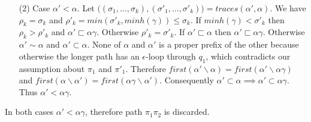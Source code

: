 \documentclass[AMA,STIX1COL]{WileyNJD-v2}
\begin{document}
\begin{proofEnd}
\begin{itemize}[itemsep=0.5em, topsep=0.5em]
    \item[(2)]
        Case $\alpha' < \alpha$.
        Let $\big( (\sigma_1, \hdots, \sigma_k), (\sigma'_1, \hdots, \sigma'_k) \big) = traces (\alpha', \alpha)$.
        We have $\rho_k = \sigma_k$ and $\rho'_k = min (\sigma'_k, minh(\gamma)) \leq \sigma_k$.
        If $minh(\gamma) < \sigma'_k$ then $\rho_k > \rho'_k$ and $\alpha' \sqsubset \alpha \gamma$.
        Otherwise $\rho'_k = \sigma'_k$.
        If $\alpha' \sqsubset \alpha$ then $\alpha' \sqsubset \alpha \gamma$.
        Otherwise $\alpha' \sim \alpha$ and $\alpha' \subset \alpha$.
        None of $\alpha$ and $\alpha'$ is a proper prefix of the other
        because otherwise the longer path has an $\epsilon$-loop through $q_1$, which contradicts our assumption about $\pi_1$ and $\pi'_1$.
        Therefore $first (\alpha' \backslash \alpha) = first (\alpha' \backslash \alpha \gamma)$
        and $first (\alpha \backslash \alpha') = first (\alpha \gamma \backslash \alpha')$.
        Consequently $\alpha' \subset \alpha \implies \alpha' \subset \alpha \gamma$.
        Thus $\alpha' < \alpha \gamma$.
    \end{itemize}
    In both cases $\alpha' < \alpha \gamma$, therefore path $\pi_1 \pi_2$ is discarded.
\end{proofEnd}
\vspace{-0.5em}
\end{document}
